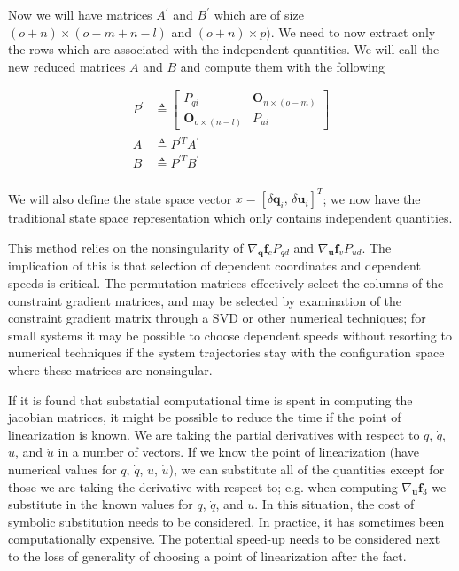 \documentclass{svjour3}                     %
\begin{document}
Now we will have matrices $A^\prime$ and $B^\prime$ which are of size $(o +
n) \times (o - m + n - l)$ and $(o + n) \times p)$. We need to now extract only
the rows which are associated with the independent quantities. We will call the
new reduced matrices $A$ and $B$ and compute them with the following

\begin{align}
    P^\prime &\triangleq \begin{bmatrix}
        P_{qi} & \bm{O}_{n \times (o - m)} \\
        \bm{O}_{o \times (n - l)} & P_{ui}
    \end{bmatrix} \\
    A &\triangleq P^{\prime T} A^\prime \\
    B &\triangleq P^{\prime T} B^\prime \\
\end{align}

We will also define the state space vector $x =
\left[\delta\bm{q}_i,\,\delta\bm{u}_i\right]^{T}$; we now have the traditional
state space representation which only contains independent quantities.

This method relies on the nonsingularity of $\nabla_{\bm{q}}\bm{f}_{c} P_{qd}$
and $\nabla_{\bm{u}} \bm{f}_{v} P_{ud}$.  The implication of this is that
selection of dependent coordinates and dependent speeds is critical.  The
permutation matrices effectively select the columns of the constraint gradient
matrices, and may be selected by examination of the constraint gradient matrix
through a SVD or other numerical techniques; for small systems it may be
possible to choose dependent speeds without resorting to numerical techniques
if the system trajectories stay with the configuration space where these
matrices are nonsingular.

If it is found that substatial computational time is spent in computing the
jacobian matrices, it might be possible to reduce the time if the point of
linearization is known. We are taking the partial derivatives with respect to
$q$, $\dot{q}$, $u$, and $\dot{u}$ in a number of vectors. If we know the point
of linearization (have numerical values for $q$, $\dot{q}$, $u$, $\dot{u}$), we
can substitute all of the quantities except for those we are taking the
derivative with respect to; e.g. when computing $\nabla_{\bm{u}} \bm{f}_3$ we
substitute in the known values for $q$, $\dot{q}$, and $u$. In this situation,
the cost of symbolic substitution needs to be considered. In practice, it has
sometimes been computationally expensive. The potential speed-up needs to be
considered next to the loss of generality of choosing a point of linearization
after the fact.
\end{document}
